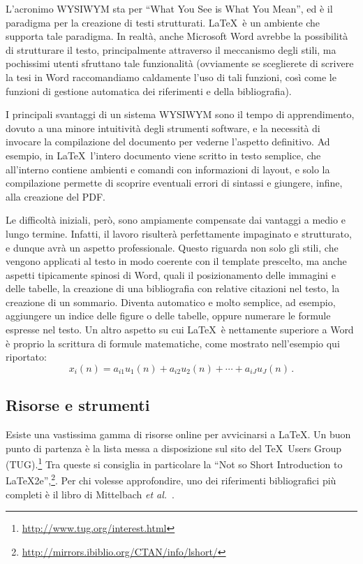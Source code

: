 \documentclass[12pt]{report}
\begin{document}
    L'acronimo WYSIWYM sta per ``What You See is What You Mean'', ed è il paradigma per la creazione di testi strutturati. \LaTeX\ è un ambiente che supporta tale paradigma. In realtà, anche Microsoft Word avrebbe la possibilità di strutturare il testo, principalmente attraverso il meccanismo degli stili, ma pochissimi utenti sfruttano tale funzionalità (ovviamente se sceglierete di scrivere la tesi in Word raccomandiamo caldamente l'uso di tali funzioni, così come le funzioni di gestione automatica dei riferimenti e della bibliografia).

    I principali svantaggi di un sistema WYSIWYM sono il tempo di apprendimento, dovuto a una minore intuitività degli strumenti software, e la necessità di invocare la compilazione del documento per vederne l'aspetto definitivo. Ad esempio, in \LaTeX\ l'intero documento viene scritto in testo semplice, che all'interno contiene ambienti e comandi con informazioni di layout, e solo la compilazione permette di scoprire eventuali errori di sintassi e giungere, infine, alla creazione del PDF.

    Le difficoltà iniziali, però, sono ampiamente compensate dai vantaggi a medio e lungo termine. Infatti, il lavoro risulterà perfettamente impaginato e strutturato, e dunque avrà un aspetto professionale. Questo riguarda non solo gli stili, che vengono applicati al testo in modo coerente con il template prescelto, ma anche aspetti tipicamente spinosi di Word, quali il posizionamento delle immagini e delle tabelle, la creazione di una bibliografia con relative citazioni nel testo, la creazione di un sommario. Diventa automatico e molto semplice, ad esempio, aggiungere un indice delle figure o delle tabelle, oppure numerare le formule espresse nel testo. Un altro aspetto su cui \LaTeX\ è nettamente superiore a Word è proprio la scrittura di formule matematiche, come mostrato nell'esempio qui riportato:
    \begin{equation}
        x_i(n) = a_{i1}u_1(n) + a_{i2}u_2(n) + \cdots + a_{iJ}u_J(n) \, .
        \label{eq:multimix}
    \end{equation}

    \subsection{Risorse e strumenti}

    Esiste una vastissima gamma di risorse online per avvicinarsi a \LaTeX. Un buon punto di partenza \`e la lista messa a disposizione sul sito del \TeX\ Users Group (TUG).\footnote{\url{http://www.tug.org/interest.html}}
    Tra queste si consiglia in particolare la ``Not so Short Introduction to LaTeX2e'',\footnote{\url{http://mirrors.ibiblio.org/CTAN/info/lshort/}}. Per chi volesse approfondire, uno dei riferimenti bibliografici pi\`u completi \`e il libro di Mittelbach {\em et al.}~\cite{mittelbach2004latex}.
\end{document}
